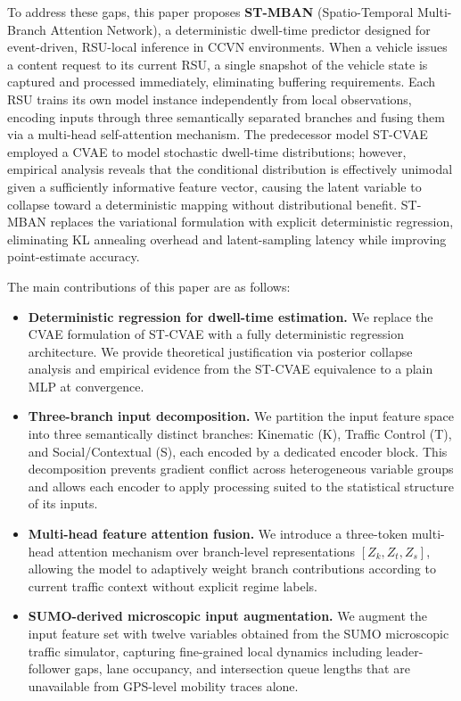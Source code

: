 \documentclass[journal]{IEEEtran}
\begin{document}
\IEEEpubidadjcol
To address these gaps, this paper proposes \textbf{ST-MBAN}
(Spatio-Temporal Multi-Branch Attention Network), a deterministic dwell-time predictor
designed for event-driven, RSU-local inference in CCVN environments.
When a vehicle issues a content request to its current RSU, a single snapshot of the
vehicle state is captured and processed immediately, eliminating buffering requirements.
Each RSU trains its own model instance independently from local observations,
encoding inputs through three semantically separated branches and fusing them
via a multi-head self-attention mechanism.
The predecessor model ST-CVAE employed a CVAE to model stochastic dwell-time
distributions; however, empirical analysis reveals that the conditional distribution
is effectively unimodal given a sufficiently informative feature vector, causing the
latent variable to collapse toward a deterministic mapping without distributional
benefit. ST-MBAN replaces the variational formulation with explicit deterministic
regression, eliminating KL annealing overhead and latent-sampling latency while
improving point-estimate accuracy.

The main contributions of this paper are as follows:

\begin{itemize}
    \item \textbf{Deterministic regression for dwell-time estimation.}
    We replace the CVAE formulation of ST-CVAE with a fully deterministic regression
    architecture. We provide theoretical justification via posterior collapse analysis
    and empirical evidence from the ST-CVAE equivalence to a plain MLP at convergence.

    \item \textbf{Three-branch input decomposition.}
    We partition the input feature space into three semantically distinct branches:
    Kinematic (K), Traffic Control (T), and Social/Contextual (S), each encoded
    by a dedicated encoder block. This decomposition prevents gradient conflict
    across heterogeneous variable groups and allows each encoder to apply processing
    suited to the statistical structure of its inputs.

    \item \textbf{Multi-head feature attention fusion.}
    We introduce a three-token multi-head attention mechanism over branch-level
    representations $[Z_k, Z_t, Z_s]$, allowing the model to adaptively weight
    branch contributions according to current traffic context without explicit
    regime labels.

    \item \textbf{SUMO-derived microscopic input augmentation.}
    We augment the input feature set with twelve variables obtained from the SUMO
    microscopic traffic simulator, capturing fine-grained local dynamics
    including leader-follower gaps, lane occupancy, and intersection queue lengths
    that are unavailable from GPS-level mobility traces alone.
\end{itemize}
\end{document}
